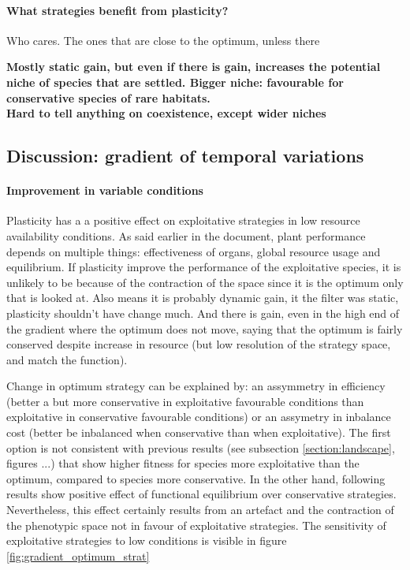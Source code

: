 \paragraph{What strategies benefit from plasticity?}

Who cares. The ones that are close to the optimum, unless there

\textbf{Mostly static gain, but even if there is gain, increases the potential niche of species that are settled. Bigger niche: favourable for conservative species of rare habitats.\\
Hard to tell anything on coexistence, except wider niches}


\subsection{Discussion: gradient of temporal variations}


\paragraph{Improvement in variable conditions}
Plasticity has a a positive effect on exploitative strategies in low resource availability conditions. As said earlier in the document, plant performance depends on multiple things: effectiveness of organs, global resource usage and equilibrium. 
If plasticity improve the performance of the exploitative species, it is unlikely to be because of the contraction of the space since it is the optimum only that is looked at. Also means it is probably dynamic gain, it the filter was static, plasticity shouldn't have change much. And there is gain, even in the high end of the gradient where the optimum does not move, saying that the optimum is fairly conserved despite increase in resource (but low resolution of the strategy space, and match the function). 

Change in optimum strategy can be explained by: an assymmetry in efficiency (better a but more conservative in exploitative favourable conditions than exploitative in conservative favourable conditions) or an assymetry in inbalance cost (better be inbalanced when conservative than when exploitative). The first option is not consistent with previous results (see subsection \ref{section:landscape}, figures ...) that show higher fitness for species more exploitative than the optimum, compared to species more conservative. In the other hand, following results show positive effect of functional equilibrium over conservative strategies. Nevertheless, this effect certainly results from an artefact and the contraction of the phenotypic space not in favour of exploitative strategies. The sensitivity of exploitative strategies to low conditions is visible in figure \ref{fig:gradient_optimum_strat}

